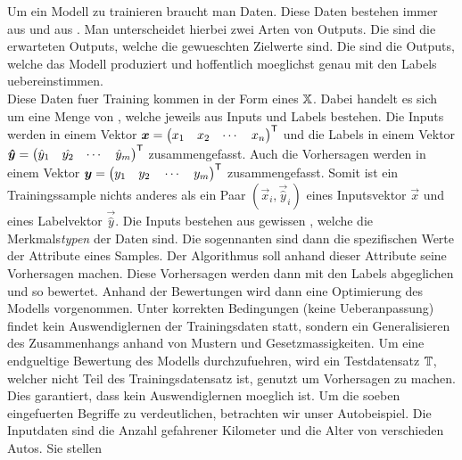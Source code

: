 Um ein Modell zu trainieren braucht man Daten. Diese Daten bestehen immer aus
 und aus . Man unterscheidet hierbei zwei Arten
von Outputs. Die  sind die erwarteten Outputs, welche die
gewueschten Zielwerte sind. Die  sind die Outputs, welche
das Modell produziert und hoffentlich moeglichst genau mit den Labels
uebereinstimmen. \\
Diese Daten fuer Training kommen in der Form eines  $\mathbb{X}$.
Dabei handelt es sich um eine Menge von ,
welche jeweils aus Inputs und Labels bestehen.
Die Inputs werden in einem Vektor
$\bm{x} = \begin{pmatrix} x_1 & x_2 & \cdots & x_n \end{pmatrix}^{\mathsf{T}}$
und die Labels in einem Vektor
$\bm{\hat{y}} = \begin{pmatrix} \hat{y}_1 & \hat{y_2} & \cdots & \hat{y}_m \end{pmatrix}^{\mathsf{T}}$
zusammengefasst. Auch die Vorhersagen werden in einem Vektor
$\bm{y} = \begin{pmatrix} y_1 \quad y_2 \quad \cdots \quad y_m \end{pmatrix}^{\mathsf{T}}$
zusammengefasst.
Somit ist ein Trainingssample nichts anderes als ein Paar
$(\vec{x}_i,\vec{\hat{y}}_i)$ eines Inputsvektor $\vec{x}$ und eines Labelvektor
$\vec{\hat{y}}$.
\para{}
Die Inputs bestehen aus gewissen , welche die
Merkmals\textit{typen} der Daten sind. Die sogennanten  sind
dann die spezifischen Werte der Attribute eines Samples. Der Algorithmus soll
anhand dieser Attribute seine Vorhersagen machen.
Diese Vorhersagen werden dann mit den Labels abgeglichen und so bewertet.
Anhand der Bewertungen wird dann eine Optimierung des Modells vorgenommen.
Unter korrekten Bedingungen (keine Ueberanpassung) findet kein Auswendiglernen der Trainingsdaten statt,
sondern ein Generalisieren des Zusammenhangs anhand von Mustern und Gesetzmassigkeiten.
\para{}
Um eine endgueltige Bewertung des Modells durchzufuehren, wird ein Testdatensatz
$\mathbb{T}$, welcher nicht Teil des Trainingsdatensatz ist, genutzt um Vorhersagen zu machen.
Dies garantiert, dass kein Auswendiglernen moeglich ist.
\para{}
Um die soeben eingefuerten Begriffe zu verdeutlichen, betrachten wir unser Autobeispiel.
Die Inputdaten sind die Anzahl gefahrener Kilometer und die Alter von
verschieden Autos. Sie stellen


